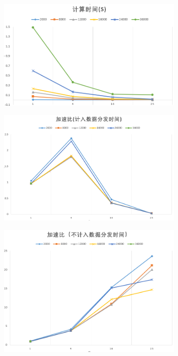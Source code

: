 \documentclass[UTF8, onecolumn, a4paper]{article}
\begin{document}
\begin{figure}[htb]
	\centering
	\includegraphics[width=0.8\textwidth]{hw3_6.png}
\end{figure}
\begin{figure}[htb]
	\centering
	\includegraphics[width=0.8\textwidth]{hw3_3.png}
\end{figure}
\begin{figure}[htb]
	\centering
	\includegraphics[width=0.8\textwidth]{hw3_4.png}
\end{figure}
\end{document}
